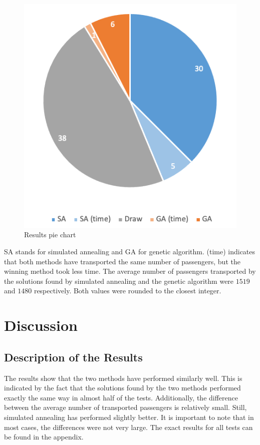 \documentclass[10pt]{scrreprt}
\begin{document}
\begin{center}
\begin{figure}[h]
    \centering
    \includegraphics[scale = 1]{pictures/results.png}
    \caption{Results pie chart}
    \label{}
\end{figure}

\end{center}

SA stands for simulated annealing and GA for genetic algorithm. (time) indicates that both methods have transported the same number of passengers, but the winning method took less time. The average number of passengers transported by the solutions found by simulated annealing and the genetic algorithm were $1519$ and $1480$ respectively. Both values were rounded to the closest integer.

\chapter{Discussion}

\section{Description of the Results}
The results show that the two methods have performed similarly well. This is indicated by the fact that the solutions found by the two methods performed exactly the same way in almost half of the tests. Additionally, the difference between the average number of transported passengers is relatively small. Still, simulated annealing has performed slightly better. It is important to note that in most cases, the differences were not very large. The exact results for all tests can be found in the appendix.
\end{document}
